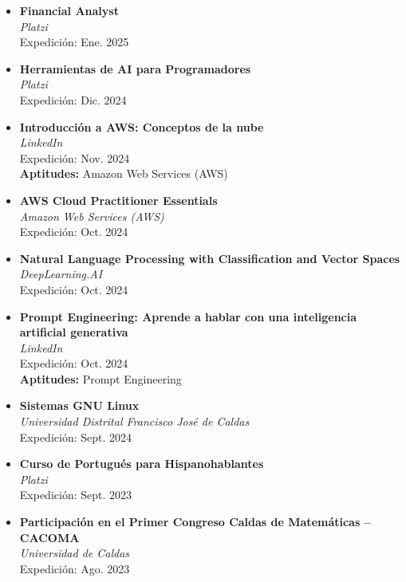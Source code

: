 \documentclass[paper=a4,fontsize=11pt]{scrartcl} %
\begin{document}
\begin{itemize}[leftmargin=*, noitemsep]
  \item \textbf{Financial Analyst} \\
        \textit{Platzi} \\
        Expedición: Ene. 2025 

  \item \textbf{Herramientas de AI para Programadores} \\
        \textit{Platzi} \\
        Expedición: Dic. 2024 

  \item \textbf{Introducción a AWS: Conceptos de la nube} \\
        \textit{LinkedIn} \\
        Expedición: Nov. 2024 \\
        \textbf{Aptitudes:} Amazon Web Services (AWS) 

  \item \textbf{AWS Cloud Practitioner Essentials} \\
        \textit{Amazon Web Services (AWS)} \\
        Expedición: Oct. 2024 

  \item \textbf{Natural Language Processing with Classification and Vector Spaces} \\
        \textit{DeepLearning.AI} \\
        Expedición: Oct. 2024 

  \item \textbf{Prompt Engineering: Aprende a hablar con una inteligencia artificial generativa} \\
        \textit{LinkedIn} \\
        Expedición: Oct. 2024 \\
        \textbf{Aptitudes:} Prompt Engineering 

  \item \textbf{Sistemas GNU Linux} \\
        \textit{Universidad Distrital Francisco José de Caldas} \\
        Expedición: Sept. 2024 

  \item \textbf{Curso de Portugués para Hispanohablantes} \\
        \textit{Platzi} \\
        Expedición: Sept. 2023 

  \item \textbf{Participación en el Primer Congreso Caldas de Matemáticas – CACOMA} \\
        \textit{Universidad de Caldas} \\
        Expedición: Ago. 2023


\end{itemize}
\end{document}
